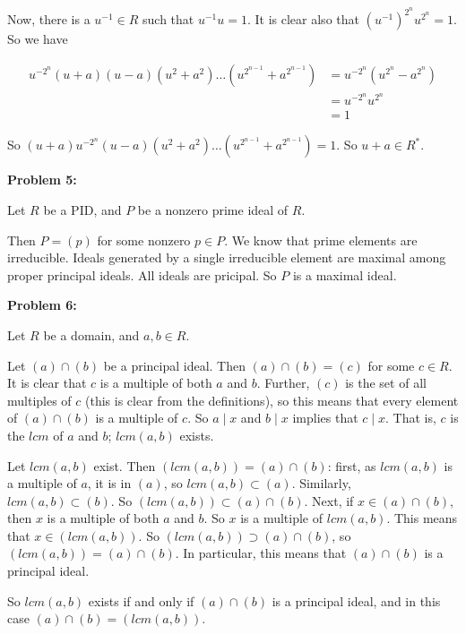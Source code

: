 \documentclass[a4paper,12pt]{article}
\newcommand{\shunt}{\vspace{20mm}}
\begin{document}
Now, there is a $u^{-1} \in R$ such that $u^{-1}u=1$. It is clear also that $(u^{-1})^{2^n}u^{2^n} = 1$. So we have

\begin{align*}
u^{-2^n}(u+a)(u-a)(u^2+a^2)\ldots(u^{2^{n-1}}+a^{2^{n-1}}) &= u^{-2^n}(u^{2^n} - a^{2^n})\\
&=u^{-2^n}u^{2^n}\\
&=1
\end{align*}

So $(u+a)u^{-2^n}(u-a)(u^2+a^2)\ldots(u^{2^{n-1}}+a^{2^{n-1}})=1$. So $u+a \in R^*$.

\shunt

{\bf Problem 5:}

Let $R$ be a PID, and $P$ be a nonzero prime ideal of $R$.

Then $P = (p)$ for some nonzero $p \in P$. We know that prime elements are irreducible. Ideals generated by a single irreducible element are maximal among proper principal ideals. All ideals are pricipal. So $P$ is a maximal ideal.

\shunt

{\bf Problem 6:}

Let $R$ be a domain, and $a, b \in R$.

Let $(a) \cap (b)$ be a principal ideal. Then $(a) \cap (b) = (c)$ for some $c \in R$. It is clear that $c$ is a multiple of both $a$ and $b$. Further, $(c)$ is the set of all multiples of $c$ (this is clear from the definitions), so this means that every element of $(a) \cap (b)$ is a multiple of $c$. So $a \mid x$ and $b \mid x$ implies that $c \mid x$. That is, $c$ is the $lcm$ of $a$ and $b$; $lcm(a,b)$ exists.

Let $lcm(a,b)$ exist. Then $(lcm(a,b)) = (a) \cap (b)$: first, as $lcm(a,b)$ is a multiple of $a$, it is in $(a)$, so $lcm(a,b) \subset (a)$. Similarly, $lcm(a,b) \subset (b)$. So $(lcm(a,b)) \subset (a) \cap (b)$. Next, if $x \in (a) \cap (b)$, then $x$ is a multiple of both $a$ and $b$. So $x$ is a multiple of $lcm(a,b)$. This means that $x \in (lcm(a,b))$. So $(lcm(a,b)) \supset (a) \cap (b)$, so $(lcm(a,b)) = (a) \cap (b)$. In particular, this means that $(a) \cap (b)$ is a principal ideal.

So $lcm(a,b)$ exists if and only if $(a) \cap (b)$ is a principal ideal, and in this case $(a) \cap (b) = (lcm(a,b))$.

\shunt
\end{document}
